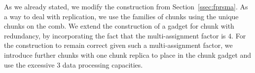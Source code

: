 %
%

 As we already stated, we modify the construction from Section~\ref{ssec:fprsma}.
As a way to deal with replication, we use the families of chunks using the unique chunks on the comb.
We extend the construction of a gadget for chunk with redundancy, by incorporating the fact that the multi-assignment factor is $4$.
For the construction to remain correct given such a multi-assignment factor, we introduce further chunks with one chunk replica to place in the chunk gadget and use the excessive $3$ data processing capacities.

